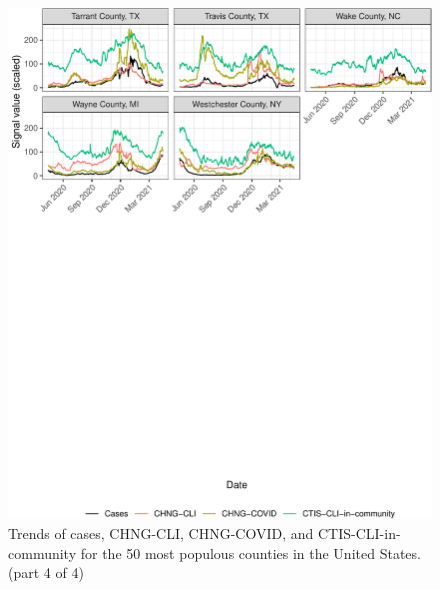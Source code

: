 \begin{figure}

{\centering \includegraphics[width=\textwidth]{fig/county-trend-grids-4-1}

}

\caption{Trends of cases, CHNG-CLI, CHNG-COVID, and CTIS-CLI-in-community for the 50 most populous counties in the United States. (part 4 of 4)}\label{fig:county-trend-grids-4}
\end{figure}

\clearpage

